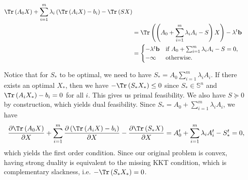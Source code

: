 \documentclass{article}
\begin{document}
\begin{itemize}
\begin{align*}
               \Tr\left(A_0X\right) +
               \sum_{i = 1}^{m}\lambda_{i}
               \left(\Tr\left(A_{i}X\right) - b_{i}\right) -
               \Tr\left(SX\right) \\
               &= \Tr\left(
               \left(
               A_0 + \sum_{i = 1}^{m} \lambda_{i}A_{i} -S
               \right)X
               \right)
               -\lambda^{t}\mathbf{b} \\
               &= 
               \begin{cases}
                   -\lambda^{t}\mathbf{b} &\text{if } 
                   A_0  + \sum_{i = 1}^{m}\lambda_{i}A_{i} - S = 0, \\
                   -\infty &\text{otherwise.}
               \end{cases}
           \end{align*}
           
           Notice that for $S_{*}$ to be optimal,
           we need to have $S_{*} = A_0 \sum_{i = 1}^{m} \lambda_{i}A_{i}$.
           If there exists an optimal $X_{*}$,
           then we have $-\Tr\left(S_{*}X_{*}\right) \leq 0$
           since $S_{*} \in \mathbb{S}^{n}$ and
           $\Tr\left(A_{i}X_{*}\right) - b_{i} = 0$
           for all $i$. This gives us primal feasibility.
           We also have $S \succeq 0$ by construction, which
           yields dual feasibility.
           Since $S_{*} = A_0 + \sum_{i = 1}^{m} \lambda_{i}A_{i}$,
           we have
           \begin{equation*}
               \frac{\partial \Tr\left(A_0X\right)}{\partial X} + 
               \sum_{i = 1}^{m} \frac{\partial \left(\Tr\left(A_{i}X\right) - b_{i}\right)}{\partial X} -
               \frac{\partial \Tr\left(S_{*}X\right)}{\partial X}
               = A_{0}^{t} + \sum_{i = 1}^{m}\lambda_{i} A_{i}^{t} - S_{*}^{t} = 0,
           \end{equation*}
           which yields the first order condition.
           Since our original problem is convex,
           having strong duality is equivalent
           to the missing KKT condition,
           which is complementary slackness,
           i.e. $-\Tr\left(S_{*}X_{*}\right) = 0$.
   \end{itemize}
   \begin{exo}          
   \end{exo}
\end{document}
